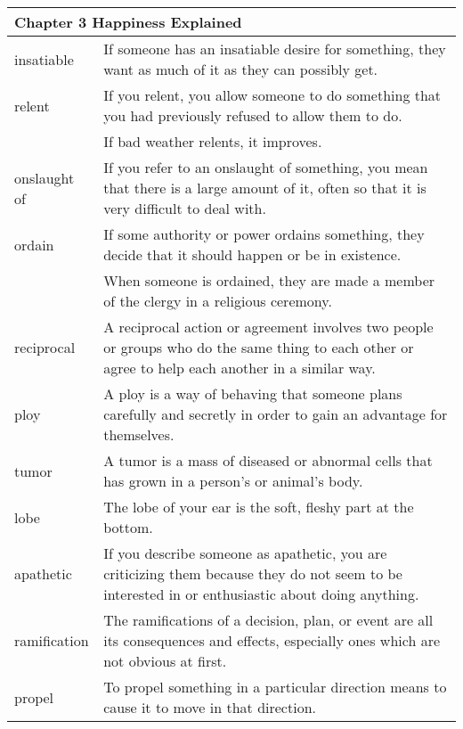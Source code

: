 \documentclass{article}
\begin{document}
\begin{center}
\begin{longtable}{|l|p{9cm}|}
\hline
\multicolumn{2}{|l|}{\textbf{Chapter 3 Happiness Explained}}\\
\hline
insatiable
&
If someone has an insatiable desire for something, they want as much of it as they can possibly get.
\\

\hline
relent
&
If you relent, you allow someone to do something that you had previously refused to allow them to do.
\\

&
If bad weather relents, it improves.
\\

\hline
onslaught of
&
If you refer to an onslaught of something, you mean that there is a large amount of it, often so that it is very difficult to deal with.
\\

\hline
ordain
&
If some authority or power ordains something, they decide that it should happen or be in existence.
\\

&
When someone is ordained, they are made a member of the clergy in a religious ceremony.
\\

\hline
reciprocal
&
A reciprocal action or agreement involves two people or groups who do the same thing to each other or agree to help each another in a similar way.
\\

\hline
ploy
&
A ploy is a way of behaving that someone plans carefully and secretly in order to gain an advantage for themselves.
\\

\hline
tumor
&
A tumor is a mass of diseased or abnormal cells that has grown in a person's or animal's body.
\\

\hline
lobe
&
The lobe of your ear is the soft, fleshy part at the bottom.
\\

\hline
apathetic
&
If you describe someone as apathetic, you are criticizing them because they do not seem to be interested in or enthusiastic about doing anything.
\\

\hline
ramification
&
The ramifications of a decision, plan, or event are all its consequences and effects, especially ones which are not obvious at first.
\\

\hline
propel
&
To propel something in a particular direction means to cause it to move in that direction.
\\


\end{longtable}
\end{center}
\end{document}
